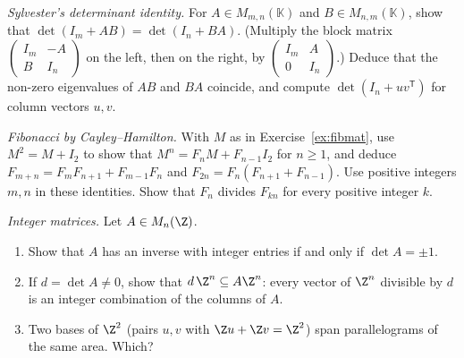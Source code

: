 \begin{exercise}[$\star\star$]\label{ex:sylvester}
\emph{Sylvester's determinant identity.} For $A\in M_{m,n}(\mathbb K)$ and $B\in M_{n,m}(\mathbb K)$, show that $\det(I_m+AB)=\det(I_n+BA)$. (Multiply the block matrix $\begin{pmatrix}I_m&-A\\B&I_n\end{pmatrix}$ on the left, then on the right, by $\begin{pmatrix}I_m&A\\0&I_n\end{pmatrix}$.) Deduce that the non-zero eigenvalues of $AB$ and $BA$ coincide, and compute $\det(I_n+uv^{\mathsf T})$ for column vectors $u,v$.
\end{exercise}

\begin{exercise}[$\star$]\label{ex:fibch}
\emph{Fibonacci by Cayley--Hamilton.} With $M$ as in Exercise~\ref{ex:fibmat}, use $M^2=M+I_2$ to show that $M^n=F_nM+F_{n-1}I_2$ for $n\ge1$, and deduce $F_{m+n}=F_mF_{n+1}+F_{m-1}F_n$ and $F_{2n}=F_n(F_{n+1}+F_{n-1})$. Use positive integers $m,n$ in these identities. Show that $F_n$ divides $F_{kn}$ for every positive integer $k$.
\end{exercise}

\begin{exercise}[$\star\star$]\label{ex:intinverse}
\emph{Integer matrices.} Let $A\in M_n(\Z)$.
\begin{enumerate}[label=(\alph*)]
\item Show that $A$ has an inverse with integer entries if and only if $\det A=\pm1$.
\item If $d=\det A\ne0$, show that $d\,\Z^n\subseteq A\Z^n$: every vector of $\Z^n$ divisible by $d$ is an integer combination of the columns of $A$.
\item Two bases of $\Z^2$ (pairs $u,v$ with $\Z u+\Z v=\Z^2$) span parallelograms of the same area. Which?
\end{enumerate}
\end{exercise}

